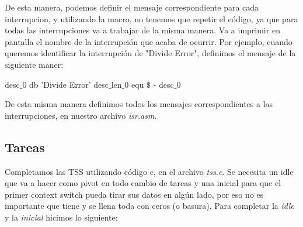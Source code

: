 De esta manera, podemos definir el mensaje correspondiente para cada interrupcion, y utilizando la macro, no tenemos que repetir el c\'odigo, ya que para todas las interrupciones va a trabajar de la misma manera. Va a imprimir en pantalla el nombre de la interrupci\'on que acaba de ocurrir.
Por ejemplo, cuando queremos identificar la interrupci\'on de "Divide Error", definimos el mensaje de la siguiente maner:

\begin{algorithmic}
\State \tab desc$\_$0 db   'Divide Error'
\State \tab desc$\_$len$\_$0 equ     $\$$ - desc$\_$0
\end{algorithmic}

De esta misma manera definimos todos los mensajes correspondientes a las interrupciones, en nuestro archivo \textit{isr.asm}.
\subsection{Tareas}

Completamos las TSS utilizando c\'odigo c, en el archivo \textit{tss.c}. Se necesita un idle que va a hacer como pivot en todo cambio de tareas y una inicial para que el primer context switch pueda tirar sus datos en algún lado, por eso no es importante que tiene y se llena toda con ceros (o basura).
Para completar la \textit{idle}  y la \textit{inicial} hicimos lo siguiente:

